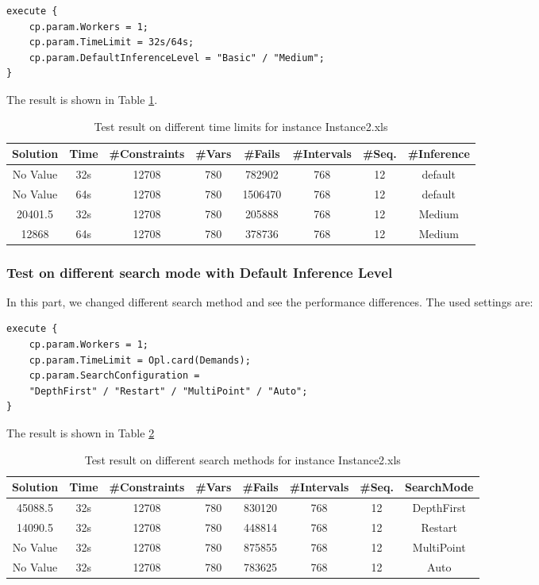 \documentclass[a4paper, 12pt]{article}
\begin{document}
\begin{lstlisting}
execute {
    cp.param.Workers = 1;
    cp.param.TimeLimit = 32s/64s; 
    cp.param.DefaultInferenceLevel = "Basic" / "Medium";
}
\end{lstlisting}

The result is shown in Table \ref{diffTime2}.
\begin{table}
    \centering
    \caption{Test result on different time limits for instance Instance2.xls}
    \label{diffTime2}
    \begin{tabular}{|c|c|c|c|c|c|c|c|}
        \hline
        Solution & Time & \#Constraints & \#Vars & \#Fails & \#Intervals & \#Seq. & \#Inference \\
        \hline
        No Value & 32s & 12708 & 780 & 782902 & 768 & 12 & default \\
        \hline 
        No Value & 64s & 12708 & 780 & 1506470 & 768 & 12 & default \\
        \hline
        20401.5 & 32s & 12708 & 780 & 205888 & 768 & 12 & Medium \\
        \hline 
        12868 & 64s & 12708 & 780 & 378736 & 768 & 12 & Medium \\
        \hline 
    \end{tabular}
\end{table}

\subsubsection{Test on different search mode with Default Inference Level}

In this part, we changed different search method and see the performance differences. The used settings are: 

\begin{lstlisting}
execute {
    cp.param.Workers = 1;
    cp.param.TimeLimit = Opl.card(Demands); 
    cp.param.SearchConfiguration = 
    "DepthFirst" / "Restart" / "MultiPoint" / "Auto";
}
\end{lstlisting}

The result is shown in Table \ref{diffSear2}

\begin{table}
    \centering
    \caption{Test result on different search methods for instance Instance2.xls}
    \label{diffSear2}
    \begin{tabular}{|c|c|c|c|c|c|c|c|}
        \hline
        Solution & Time & \#Constraints & \#Vars & \#Fails & \#Intervals & \#Seq. & SearchMode \\
        \hline
        45088.5 & 32s & 12708 & 780 & 830120 & 768 & 12 & DepthFirst \\
        \hline 
        14090.5 & 32s & 12708 & 780 & 448814 & 768 & 12 & Restart \\
        \hline
        No Value & 32s & 12708 & 780 & 875855 & 768 & 12 & MultiPoint \\
        \hline
        No Value & 32s & 12708 & 780 & 783625 & 768 & 12 & Auto \\
        \hline
    \end{tabular}
\end{table}
\end{document}
